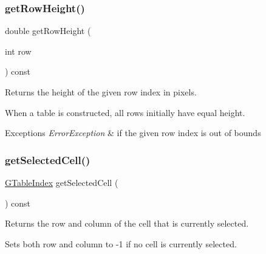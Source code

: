 \mbox{\label{classsgl_1_1GTable_a0215a742506665475b721ed12913808b}} 
\subsubsection{\texorpdfstring{get\+Row\+Height()}{getRowHeight()}}
{\footnotesize\ttfamily double get\+Row\+Height (\begin{DoxyParamCaption}\item[{int}]{row }\end{DoxyParamCaption}) const\hspace{0.3cm}{\ttfamily [virtual]}}



Returns the height of the given row index in pixels. 

When a table is constructed, all rows initially have equal height. 
\begin{DoxyExceptions}{Exceptions}
{\em Error\+Exception} & if the given row index is out of bounds \\
\hline
\end{DoxyExceptions}
\mbox{\label{classsgl_1_1GTable_a4dd0c3a41bdf691fc2a92fe48f7a98f6}} 
\subsubsection{\texorpdfstring{get\+Selected\+Cell()}{getSelectedCell()}\hspace{0.1cm}{\footnotesize\ttfamily [1/2]}}
{\footnotesize\ttfamily \mbox{\hyperlink{structsgl_1_1GTableIndex}{G\+Table\+Index}} get\+Selected\+Cell (\begin{DoxyParamCaption}{ }\end{DoxyParamCaption}) const\hspace{0.3cm}{\ttfamily [virtual]}}



Returns the row and column of the cell that is currently selected. 

Sets both row and column to -\/1 if no cell is currently selected. \mbox{\label{classsgl_1_1GTable_a29b4e2e079037922545996e08f7ce6c4}} 

